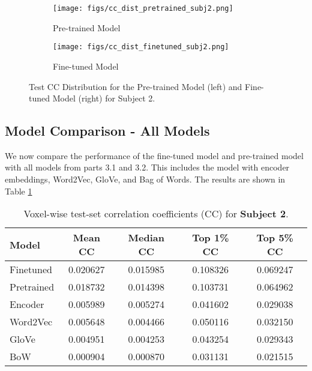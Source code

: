 \documentclass[10pt,letterpaper]{article}
\begin{document}
\begin{figure}[ht]
    \centering
    
    \begin{subfigure}[t]{0.4\textwidth}
        \centering
        \caption{Pre-trained Model}
        \texttt{[image: figs/cc\_dist\_pretrained\_subj2.png]}
        \label{fig:cc_dist_pretrained_subj2}
    \end{subfigure}
    \hfill
    \begin{subfigure}[t]{0.4\textwidth}
        \centering
        \caption{Fine-tuned Model}
        \texttt{[image: figs/cc\_dist\_finetuned\_subj2.png]}
        \label{fig:cc_dist_finetuned_subj2}
    \end{subfigure}

    \caption{Test CC Distribution for the Pre-trained Model (left) and Fine-tuned Model (right) for Subject 2.}
    \label{fig:cc_dist_pretrained_finetuned_subj2}
\end{figure}



\subsection{Model Comparison - All Models}
We now compare the performance of the fine-tuned model and pre-trained model with all models from parts 3.1 and 3.2. This includes the model with encoder embeddings, Word2Vec, GloVe, and Bag of Words. The results are shown in Table \ref{tab:cc_subject2_full}

\begin{table}[ht]
\centering
\caption{Voxel-wise test-set correlation coefficients (CC) for \textbf{Subject 2}.}
\label{tab:cc_subject2_full}
\begin{tabular}{lcccc}
\toprule
\textbf{Model} &
\textbf{Mean CC} &
\textbf{Median CC} &
\textbf{Top 1\% CC} &
\textbf{Top 5\% CC} \\
\midrule
Finetuned  & 0.020627 & 0.015985 & 0.108326 & 0.069247 \\
Pretrained & 0.018732 & 0.014398 & 0.103731 & 0.064962 \\
Encoder    & 0.005989 & 0.005274 & 0.041602 & 0.029038 \\
Word2Vec   & 0.005648 & 0.004466 & 0.050116 & 0.032150 \\
GloVe      & 0.004951 & 0.004253 & 0.043254 & 0.029343 \\
BoW        & 0.000904 & 0.000870 & 0.031131 & 0.021515 \\
\bottomrule
\end{tabular}
\end{table}
\end{document}
